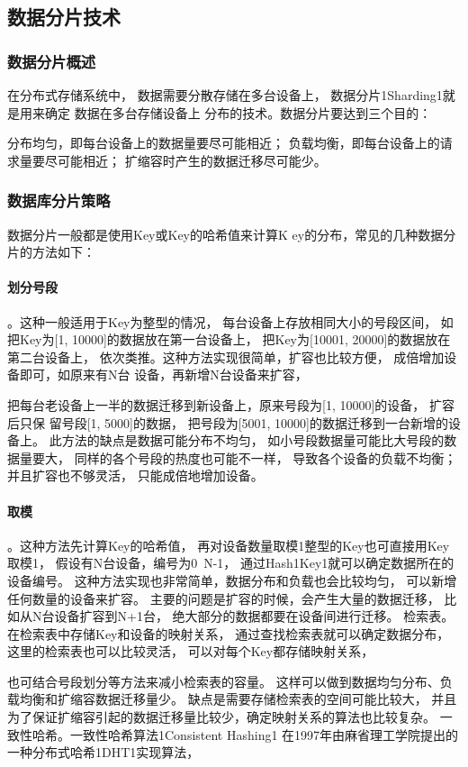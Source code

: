 \subsection*{数据分片技术}
\subsubsection*{数据分片概述}
在分布式存储系统中，
数据需要分散存储在多台设备上，
数据分片1Sharding1就是用来确定
数据在多台存储设备上
分布的技术。数据分片要达到三个目的：

分布均匀，即每台设备上的数据量要尽可能相近；
负载均衡，即每台设备上的请求量要尽可能相近；
扩缩容时产生的数据迁移尽可能少。
\subsubsection*{数据库分片策略}
数据分片一般都是使用Key或Key的哈希值来计算K
ey的分布，常见的几种数据分片的方法如下：
\paragraph{划分号段}。这种一般适用于Key为整型的情况，
每台设备上存放相同大小的号段区间，
如把Key为[1, 10000]的数据放在第一台设备上，
把Key为[10001, 20000]的数据放在
第二台设备上，
依次类推。这种方法实现很简单，扩容也比较方便，
成倍增加设备即可，如原来有N台
设备，再新增N台设备来扩容，


把每台老设备上一半的数据迁移到新设备上，原来号段为[1, 10000]的设备，
扩容后只保
留号段[1, 5000]的数据，
把号段为[5001, 10000]的数据迁移到一台新增的设备上。
此方法的缺点是数据可能分布不均匀，
如小号段数据量可能比大号段的数据量要大，
同样的各个号段的热度也可能不一样，
导致各个设备的负载不均衡；并且扩容也不够灵活，
只能成倍地增加设备。


\paragraph{取模}。这种方法先计算Key的哈希值，
再对设备数量取模1整型的Key也可直接用Key取模1，
假设有N台设备，编号为0~N-1，
通过Hash1Key1就可以确定数据所在的设备编号。
这种方法实现也非常简单，数据分布和负载也会比较均匀，
可以新增任何数量的设备来扩容。
主要的问题是扩容的时候，会产生大量的数据迁移，
比如从N台设备扩容到N+1台，
绝大部分的数据都要在设备间进行迁移。
检索表。在检索表中存储Key和设备的映射关系，
通过查找检索表就可以确定数据分布，
这里的检索表也可以比较灵活，
可以对每个Key都存储映射关系，

也可结合号段划分等方法来减小检索表的容量。
这样可以做到数据均匀分布、负载均衡和扩缩容数据迁移量少。
缺点是需要存储检索表的空间可能比较大，
并且为了保证扩缩容引起的数据迁移量比较少，确定映射关系的算法也比较复杂。
一致性哈希。一致性哈希算法1Consistent Hashing1
在1997年由麻省理工学院提出的一种分布式哈希1DHT1实现算法，

